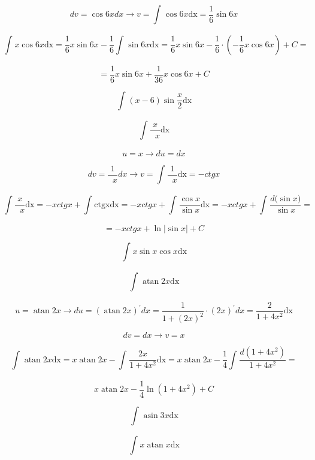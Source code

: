 \documentclass[]{article}
\begin{document}
\[dv = \cos{6x}dx \rightarrow v = \int_{}^{}{\cos{6x}\text{dx}} = \frac{1}{6}\sin{6x}\]

\[\int_{}^{}{x\cos{6x}\text{dx}} = \frac{1}{6}x\sin{6x} - \frac{1}{6}\int_{}^{}{\sin{6x}\text{dx}} = \frac{1}{6}x\sin{6x} - \frac{1}{6} \cdot \left( - \frac{1}{6}x\cos{6x} \right) + C =\]

\[= \frac{1}{6}x\sin{6x} + \frac{1}{36}x\cos{6x} + C\]

\[\int_{}^{}{(x - 6)\sin\frac{x}{2}\text{dx}}\]

\[\int_{}^{}{\frac{x}{\operatorname{}x}\text{dx}}\]

\[u = x \rightarrow du = dx\]

\[dv = \frac{1}{\operatorname{}x}dx \rightarrow v = \int_{}^{}{\frac{1}{\operatorname{}x}\text{dx}} = - ctgx\]

\[\int_{}^{}{\frac{x}{\operatorname{}x}\text{dx}} = - xctgx + \int_{}^{}{\text{ctgx}\text{dx}} = - xctgx + \int_{}^{}{\frac{\cos x}{\sin x}\text{dx}} = - xctgx + \int_{}^{}\frac{d(\sin{x)}}{\sin x} =\]

\[= - xctgx + \ln\left| \sin x \right| + C\]

\[\int_{}^{}{x\sin x\cos x\text{dx}}\]

\[\int_{}^{}{\operatorname{atan}{2x}\text{dx}}\]

\[u = \operatorname{atan}{2x} \rightarrow du = \left( \operatorname{atan}{2x} \right)^{'}dx = \frac{1}{1 + \left( 2x \right)^{2}} \cdot \left( 2x \right)^{'}dx = \frac{2}{1 + 4x^{2}}\text{dx}\]

\[dv = dx \rightarrow v = x\]

\[\int_{}^{}{\operatorname{atan}{2x}\text{dx}} = x\operatorname{atan}{2x} - \int_{}^{}{\frac{2x}{1 + 4x^{2}}\text{dx}} = x\operatorname{atan}{2x} - \frac{1}{4}\int_{}^{}\frac{d\left( 1 + 4x^{2} \right)}{1 + 4x^{2}} =\]

\[x\operatorname{atan}{2x} - \frac{1}{4}\ln\left( 1 + 4x^{2} \right) + C\]

\[\int_{}^{}{\operatorname{asin}{3x}\text{dx}}\]

\[\int_{}^{}{x\operatorname{atan}x\text{dx}}\]
\end{document}
